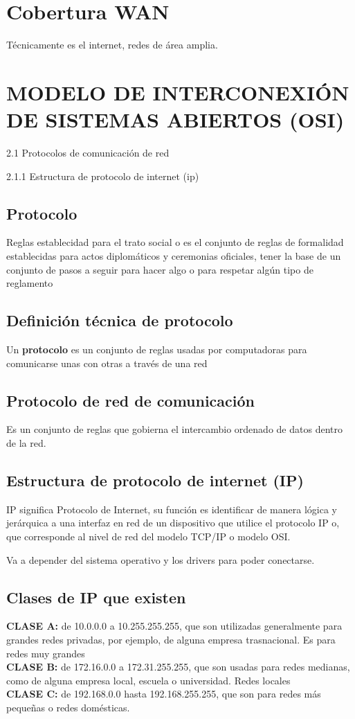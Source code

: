 \documentclass[letterpaper,12pt]{article}
\begin{document}
\begin{sloppypar}
\section{Cobertura WAN}
Técnicamente es el internet, redes de área amplia.
\newpage
\section{MODELO DE INTERCONEXIÓN DE SISTEMAS ABIERTOS (OSI)}
2.1 Protocolos de comunicación de red

2.1.1 Estructura de protocolo de internet (ip)

\subsection{Protocolo}
Reglas establecidad para el trato social o es el conjunto de reglas de formalidad establecidas para actos diplomáticos y ceremonias oficiales, tener la base de un conjunto de pasos a seguir para hacer algo o para respetar algún tipo de reglamento

\subsection{Definición técnica de protocolo}
Un \textbf{protocolo} es un conjunto de reglas usadas por computadoras para comunicarse unas con otras a través de una red

\subsection{Protocolo de red de comunicación}
Es un conjunto de reglas que gobierna el intercambio ordenado de datos dentro de la red.

\subsection{Estructura de protocolo de internet (IP)}
IP significa Protocolo de Internet, su función es identificar de manera lógica y jerárquica a una interfaz en red de un dispositivo que utilice el protocolo IP o, que corresponde al nivel de red del modelo TCP/IP o modelo OSI.

Va a depender del sistema operativo y los drivers para poder conectarse. 

\subsection{Clases de IP que existen}
\textbf{CLASE A:} de 10.0.0.0 a 10.255.255.255, que son utilizadas generalmente para grandes redes privadas, por ejemplo, de alguna empresa trasnacional. Es para redes muy grandes
\vspace{0.3cm}\\ 
\textbf{CLASE B:} de 172.16.0.0 a 172.31.255.255, que son usadas para redes medianas, como de alguna empresa local, escuela o universidad. Redes locales
\vspace{0.3cm}\\
\textbf{CLASE C: }de 192.168.0.0 hasta 192.168.255.255, que son para redes más pequeñas o redes domésticas.


\end{sloppypar}
\end{document}
